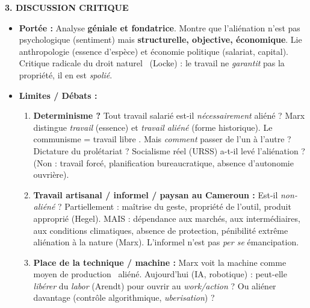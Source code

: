 \documentclass[11pt]{article}
\begin{document}
\begin{corrige}
\textbf{3. DISCUSSION CRITIQUE}
\begin{itemize}
\item \textbf{Portée :} Analyse \textbf{géniale et fondatrice}. Montre que l'aliénation n'est pas psychologique (sentiment) mais \textbf{structurelle, objective, économique}. Lie anthropologie (essence d'espèce) et économie politique (salariat, capital). Critique radicale du \guillemotleft droit naturel \guillemotright\ (Locke) : le travail ne \emph{garantit} pas la propriété, il en est \emph{spolié}.
\item \textbf{Limites / Débats :}
\begin{enumerate}
\item \textbf{Determinisme ?} Tout travail salarié est-il \emph{nécessairement} aliéné ? Marx distingue \emph{travail} (essence) et \emph{travail aliéné} (forme historique). Le communisme = \guillemotleft travail libre \guillemotright. Mais \emph{comment} passer de l'un à l'autre ? Dictature du prolétariat ? Socialisme réel (URSS) a-t-il levé l'aliénation ? (Non : travail forcé, planification bureaucratique, absence d'autonomie ouvrière).
\item \textbf{Travail artisanal / informel / paysan au Cameroun :} Est-il \emph{non-aliéné} ? Partiellement : maîtrise du geste, propriété de l'outil, produit approprié (Hegel). MAIS : dépendance aux marchés, aux intermédiaires, aux conditions climatiques, absence de protection, pénibilité extrême \guillemotleft aliénation à la nature \guillemotright (Marx). L'informel n'est pas \emph{per se} émancipation.
\item \textbf{Place de la technique / machine :} Marx voit la machine comme \guillemotleft moyen de production \guillemotright\ aliéné. Aujourd'hui (IA, robotique) : peut-elle \emph{libérer} du \emph{labor} (Arendt) pour ouvrir au \emph{work/action} ? Ou aliéner davantage (contrôle algorithmique, \emph{uberisation}) ?
\end{enumerate}
\end{itemize}


\end{corrige}
\end{document}
